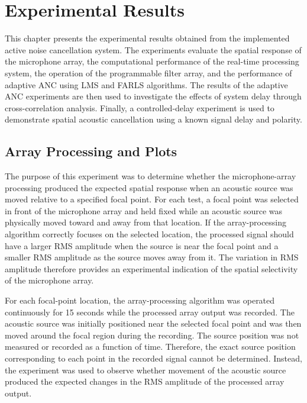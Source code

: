%
%
%
%

\chapter{Experimental Results}

This chapter presents the experimental results obtained from the implemented active noise cancellation system. The experiments evaluate the spatial response of the microphone array, the computational performance of the real-time processing system, the operation of the programmable filter array, and the performance of adaptive ANC using LMS and FARLS algorithms. The results of the adaptive ANC experiments are then used to investigate the effects of system delay through cross-correlation analysis. Finally, a controlled-delay experiment is used to demonstrate spatial acoustic cancellation using a known signal delay and polarity.

\section{Array Processing and Plots}

The purpose of this experiment was to determine whether the microphone-array processing produced the expected spatial response when an acoustic source was moved relative to a specified focal point. For each test, a focal point was selected in front of the microphone array and held fixed while an acoustic source was physically moved toward and away from that location. If the array-processing algorithm correctly focuses on the selected location, the processed signal should have a larger RMS amplitude when the source is near the focal point and a smaller RMS amplitude as the source moves away from it. The variation in RMS amplitude therefore provides an experimental indication of the spatial selectivity of the microphone array.

For each focal-point location, the array-processing algorithm was operated continuously for 15 seconds while the processed array output was recorded. The acoustic source was initially positioned near the selected focal point and was then moved around the focal region during the recording. The source position was not measured or recorded as a function of time. Therefore, the exact source position corresponding to each point in the recorded signal cannot be determined. Instead, the experiment was used to observe whether movement of the acoustic source produced the expected changes in the RMS amplitude of the processed array output.

